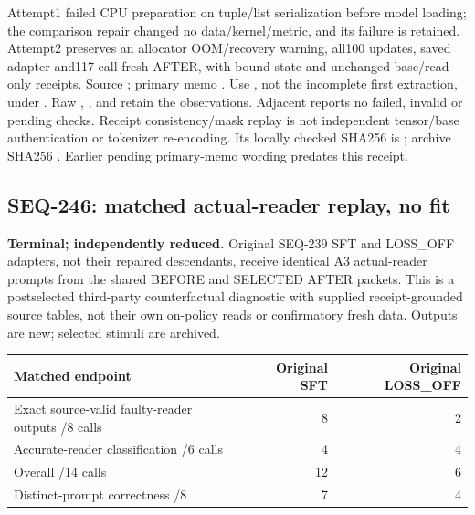 \documentclass{article}
\begin{document}
Attempt1 failed CPU preparation on tuple/list serialization before model loading;
the comparison repair changed no data/kernel/metric, and its failure is retained.
Attempt2 preserves an allocator OOM/recovery warning, all100 updates, saved
adapter and117-call fresh AFTER, with bound state and unchanged-base/read-only
receipts. Source ; primary memo
.
Use , not the incomplete first extraction, under
.
Raw , , 
and  retain the observations.
Adjacent  reports no failed,
invalid or pending checks. Receipt consistency/mask replay is not independent
tensor/base authentication or tokenizer re-encoding. Its locally checked SHA256
is ;
archive SHA256 .
Earlier pending primary-memo wording predates this receipt.

\subsection{SEQ-246: matched actual-reader replay, no fit}
\label{sec:matched-reader-replay}

\textbf{Terminal; independently reduced.} Original SEQ-239 SFT and
LOSS\_OFF adapters, not their repaired descendants, receive identical A3
actual-reader prompts from the shared BEFORE and SELECTED AFTER packets.
This is a postselected third-party counterfactual diagnostic with supplied
receipt-grounded source tables, not their own on-policy reads or confirmatory
fresh data. Outputs are new; selected stimuli are archived.

\begin{center}
\small
\begin{tabular}{lrr}
\toprule
Matched endpoint & Original SFT & Original LOSS\_OFF \\
\midrule
Exact source-valid faulty-reader outputs /8 calls & 8 & 2 \\
Accurate-reader classification /6 calls & 4 & 4 \\
Overall /14 calls & 12 & 6 \\
Distinct-prompt correctness /8 & 7 & 4 \\
\bottomrule
\end{tabular}
\end{center}
\end{document}
